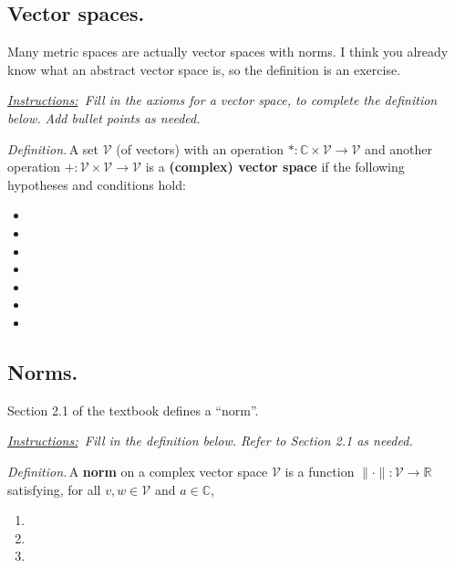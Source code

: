 \documentclass[12pt]{article}
\newcommand{\cV}{\mathcal{V}}
\newcommand{\CC}{\mathbb{C}}
\newcommand{\RR}{\mathbb{R}}
\newcommand{\sect}[1]{\subsection*{#1.}}
\newcommand{\defin}{\emph{Definition.}\,}
\newcommand{\instruct}[2]{\emph{\underline{Instructions:}\, #2} \vspace*{#1mm}}
\begin{document}
\sect{Vector spaces}  Many metric spaces are actually vector spaces with norms.  I think you already know what an abstract vector space is, so the definition is an exercise.

\instruct{0}{Fill in the axioms for a vector space, to complete the definition below.  Add bullet points as needed.}

\defin A set $\cV$ (of vectors) with an operation $*:\CC\times \cV \to \cV$ and another operation $+:\cV\times \cV\to \cV$ is a \textbf{(complex) vector space} if the following hypotheses and conditions hold:
\begin{itemize}
\item \phantom{x} \vspace{5mm}

\item \phantom{x} \vspace{5mm}

\item \phantom{x} \vspace{5mm}

\item \phantom{x} \vspace{5mm}

\item \phantom{x} \vspace{5mm}

\item \phantom{x} \vspace{5mm}

\item \phantom{x} \vspace{25mm}

\end{itemize}


\sect{Norms}  Section 2.1 of the textbook defines a ``norm''.

\instruct{0}{Fill in the definition below.  Refer to Section 2.1 as needed.}

\defin A \textbf{norm} on a complex vector space $\cV$ is a function $\|\cdot\|:\cV \to \RR$ satisfying, for all $v,w\in\cV$ and $a\in \CC$,
\begin{enumerate}
\item \phantom{foo} \vspace{5mm}

\item \phantom{foo} \vspace{5mm}

\item \phantom{foo} \vspace{7mm}

\end{enumerate}
\end{document}
